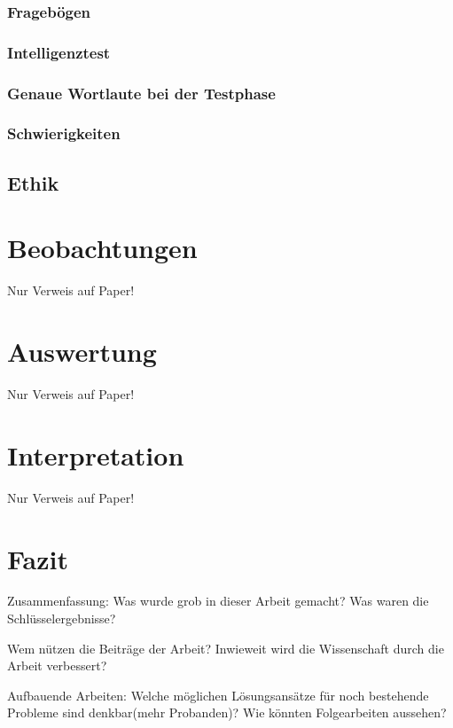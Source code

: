 \documentclass{Bericht}
\begin{document}
	\subsubsection{Fragebögen}
	\subsubsection{Intelligenztest}
	\subsubsection{Genaue Wortlaute bei der Testphase}
	\subsubsection{Schwierigkeiten}
	\subsection{Ethik}

\section{Beobachtungen}
	Nur Verweis auf Paper!

\section{Auswertung}
	Nur Verweis auf Paper!

\section{Interpretation}
	Nur Verweis auf Paper!
	
\section{Fazit}

	Zusammenfassung: Was wurde grob in dieser Arbeit gemacht? Was waren die Schlüsselergebnisse?

	Wem nützen die Beiträge der Arbeit? Inwieweit wird die Wissenschaft durch die Arbeit verbessert?

	Aufbauende Arbeiten: Welche möglichen Lösungsansätze für noch bestehende Probleme sind denkbar(mehr Probanden)? Wie könnten Folgearbeiten aussehen?
\end{document}
